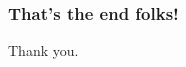 \documentclass[./main.tex]{subfiles}
\begin{document}
\begin{frame}[label=slide16]
        \frametitle{That's the end folks!}

        \nocite{*}
        
        

        \vspace{1cm}

        Thank you.

        \bigskip

        \hyperlink{slide02}{}
\end{frame}
\end{document}
